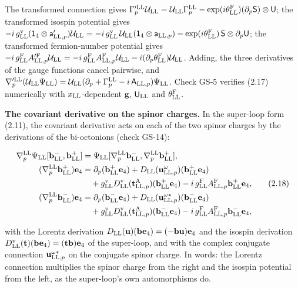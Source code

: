 \documentclass[
  10pt,
]{article}
\begin{document}
The transformed connection gives
\(\Gamma'^{\rm LL}_p\mathcal U_{\rm LL}=\mathcal U_{\rm LL}\Gamma^{\rm LL}_p-\exp(i\theta^{\rm F}_{\rm LL})(\partial_p\mathsf S)\otimes\mathsf U\);
the transformed isospin potential gives
\(-i\,g^{\rm v}_{\rm LL}(\mathsf 1_4\otimes\mathsf a'_{{\rm LL},p})\mathcal U_{\rm LL}=-i\,g^{\rm v}_{\rm LL}\,\mathcal U_{\rm LL}(\mathsf 1_4\otimes\mathsf a_{{\rm LL},p})-\exp(i\theta^{\rm F}_{\rm LL})\,\mathsf S\otimes\partial_p\mathsf U\);
the transformed fermion-number potential gives
\(-i\,g^{\rm F}_{\rm LL}A'^{\rm F}_{{\rm LL},p}\mathcal U_{\rm LL}=-i\,g^{\rm F}_{\rm LL}A^{\rm F}_{{\rm LL},p}\mathcal U_{\rm LL}-i(\partial_p\theta^{\rm F}_{\rm LL})\mathcal U_{\rm LL}\).
Adding, the three derivatives of the gauge functions cancel pairwise,
and
\(\nabla'^{\rm LL}_p(\mathcal U_{\rm LL}\Psi_{\rm LL})=\mathcal U_{\rm LL}(\partial_p+\Gamma^{\rm LL}_p-i\,\mathsf A_{{\rm LL},p})\Psi_{\rm LL}\).
Check GS-5 verifies (2.17) numerically with \(x_{\rm LL}\)-dependent
\(\mathbf g\), \(\mathsf U_{\rm LL}\) and \(\theta^{\rm F}_{\rm LL}\).

\textbf{The covariant derivative on the spinor charges.} In the
super-loop form (2.11), the covariant derivative acts on each of the two
spinor charges by the derivations of the bi-octonions (check GS-14):

\[\begin{aligned}
\nabla^{\rm LL}_p\Psi_{\rm LL}[\mathbf b^-_{\rm LL},\mathbf b^+_{\rm LL}]&=\Psi_{\rm LL}[\nabla^{\rm LL}_p\mathbf b^-_{\rm LL},\nabla^{\rm LL}_p\mathbf b^+_{\rm LL}],\\
(\nabla^{\rm LL}_p\mathbf b^+_{\rm LL})\mathbf e_4&=\partial_p(\mathbf b^+_{\rm LL}\mathbf e_4)+D_{\rm LL}(\mathbf u^\omega_{{\rm LL},p})(\mathbf b^+_{\rm LL}\mathbf e_4)\\
&\quad+g^{\rm v}_{\rm LL}D^{\rm v}_{\rm LL}(\mathbf t^{\rm A}_{{\rm LL},p})(\mathbf b^+_{\rm LL}\mathbf e_4)-i\,g^{\rm F}_{\rm LL}A^{\rm F}_{{\rm LL},p}\mathbf b^+_{\rm LL}\mathbf e_4,\\
(\nabla^{\rm LL}_p\mathbf b^-_{\rm LL})\mathbf e_4&=\partial_p(\mathbf b^-_{\rm LL}\mathbf e_4)+D_{\rm LL}(\mathbf u^{\omega*}_{{\rm LL},p})(\mathbf b^-_{\rm LL}\mathbf e_4)\\
&\quad+g^{\rm v}_{\rm LL}D^{\rm v}_{\rm LL}(\mathbf t^{\rm A}_{{\rm LL},p})(\mathbf b^-_{\rm LL}\mathbf e_4)-i\,g^{\rm F}_{\rm LL}A^{\rm F}_{{\rm LL},p}\mathbf b^-_{\rm LL}\mathbf e_4,
\end{aligned}\tag{2.18}\]

with the Lorentz derivation
\(D_{\rm LL}(\mathbf u)(\mathbf b\mathbf e_4)=(-\mathbf b\mathbf u)\mathbf e_4\)
and the isospin derivation
\(D^{\rm v}_{\rm LL}(\mathbf t)(\mathbf b\mathbf e_4)=(\mathbf t\mathbf b)\mathbf e_4\)
of the super-loop, and with the complex conjugate connection
\(\mathbf u^{\omega*}_{{\rm LL},p}\) on the conjugate spinor charge. In
words: the Lorentz connection multiplies the spinor charge from the
right and the isospin potential from the left, as the super-loop's own
automorphisms do.
\end{document}
